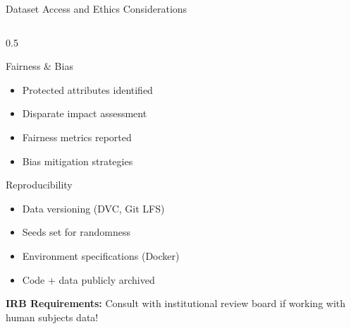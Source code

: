 \begin{frame}{Dataset Access and Ethics Considerations}
\begin{columns}
\begin{column}{0.5\textwidth}
\begin{block}{Fairness \& Bias}
\begin{itemize}
\item[$\square$] Protected attributes identified
\item[$\square$] Disparate impact assessment
\item[$\square$] Fairness metrics reported
\item[$\square$] Bias mitigation strategies
\end{itemize}
\end{block}

\begin{block}{Reproducibility}
\begin{itemize}
\item[$\square$] Data versioning (DVC, Git LFS)
\item[$\square$] Seeds set for randomness
\item[$\square$] Environment specifications (Docker)
\item[$\square$] Code + data publicly archived
\end{itemize}
\end{block}

\vspace{0.2cm}
\textbf{IRB Requirements:} Consult with institutional review board if working with human subjects data!
\end{column}
\end{columns}
\end{frame}



